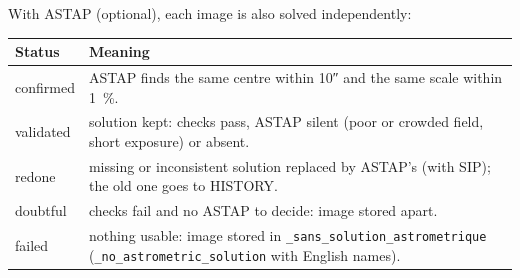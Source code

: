 With ASTAP (optional), each image is also solved independently:
\begin{center}\small
\begin{tabularx}{\linewidth}{@{}lX@{}}
\toprule
\textbf{Status} & \textbf{Meaning}\\
\midrule
confirmed & ASTAP finds the same centre within 10″ and the same scale within 1~\%.\\
validated & solution kept: checks pass, ASTAP silent (poor or crowded field, short exposure) or absent.\\
redone & missing or inconsistent solution replaced by ASTAP's (with SIP); the old one goes to HISTORY.\\
doubtful & checks fail and no ASTAP to decide: image stored apart.\\
failed & nothing usable: image stored in \texttt{\_sans\_solution\_astrometrique} (\texttt{\_no\_astrometric\_solution} with English names).\\
\bottomrule
\end{tabularx}
\end{center}

